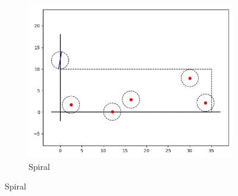 \documentclass[12pt]{article}
\begin{document}
\begin{figure}
\begin{subfigure}{.33\textwidth}
    \includegraphics[width=\textwidth]{spiral-layout.png}
    \caption{Spiral}
\end{subfigure}%
\end{figure}%
\end{document}
